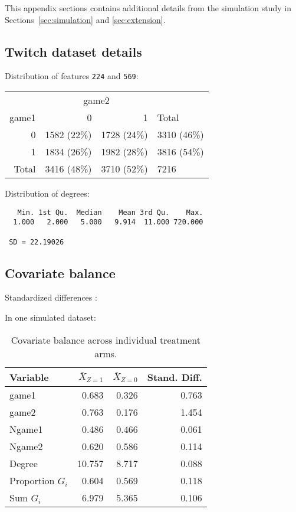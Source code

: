 \documentclass[10pt]{article}
\begin{document}
This appendix sections contains additional details from the simulation study in Sections~\ref{sec:simulation} and \ref{sec:extension}.

\subsection{Twitch dataset details} \label{apx:twitch}
\todo

Distribution of features \verb|224| and \verb|569|:

\begin{table}[H]
\centering
\begin{tabular}{@{}rrrl@{}}
\toprule
& \multicolumn{2}{c}{game2} \\
\cmidrule(lr){2-3}
game1 & 0 & 1 & Total \\
\midrule
0 & 1582 (22\%) & 1728 (24\%) & 3310 (46\%) \\
1 & 1834 (26\%) & 1982 (28\%) & 3816 (54\%) \\
Total & 3416 (48\%) & 3710 (52\%) & 7216 \\
\bottomrule
\end{tabular}
\end{table}

Distribution of degrees:
\begin{verbatim}
   Min. 1st Qu.  Median    Mean 3rd Qu.    Max. 
  1.000   2.000   5.000   9.914  11.000 720.000
  
 SD = 22.19026
\end{verbatim}

\subsection{Covariate balance} \label{apx:covbal}

Standardized differences \parencite{Austin:2011}: 

In one simulated dataset:

\begin{table}[H]
\centering
\begin{tabular}{@{}lrrr@{}}
\toprule
Variable & $\bar{X}_{Z=1}$ & $\bar{X}_{Z=0}$ & Stand. Diff. \\
\midrule
game1 & 0.683 & 0.326 & 0.763 \\
game2 & 0.763 & 0.176 & 1.454 \\
Ngame1 & 0.486 & 0.466 & 0.061 \\
Ngame2 & 0.620 & 0.586 & 0.114 \\
Degree & 10.757 & 8.717 & 0.088 \\
Proportion $G_i$ & 0.604 & 0.569 & 0.118 \\
Sum $G_i$ & 6.979 & 5.365 & 0.106 \\
\bottomrule
\end{tabular}
\caption{Covariate balance across individual treatment arms.}
\end{table}
\end{document}

